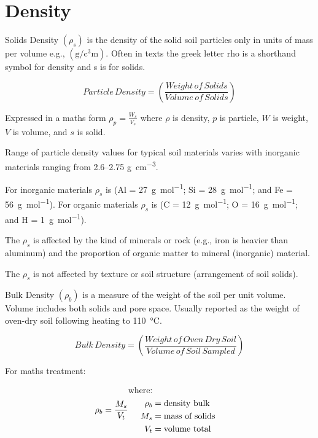 \documentclass[a5paper]{report}
\begin{document}
\section{Density}
\label{density}
    
Solids Density $\left(\rho_s\right)$ is the density of the solid soil particles only in units of mass per volume e.g., $\left(\unit{\gram\per\cubic\centi\metre}\right)$. Often in texts the greek letter rho  is a shorthand symbol for density and s is for solids.

\begin{equation}
    Particle\,Density = \left(\frac{Weight\,of\,Solids}{Volume\,of\,Solids}\right)   
\end{equation}

Expressed in a maths form $\rho_p =\frac{W_s}{V_s}$ where $\rho$ is density, $p$ is particle, $W$ is weight, $V$ is volume, and $s$ is solid.

Range of particle density values for typical soil materials varies with inorganic materials ranging from \numrange{2.6}{2.75} \unit{\gram\per\cubic\centi\metre}.

For inorganic materials $\rho_s$ is  (Al = \qty[per-mode = symbol]{27}{\gram\per\mole}; Si =  \qty[per-mode = symbol]{28}{\gram\per\mole}; and Fe = \qty[per-mode = symbol]{56}{\gram\per\mole}). For organic materials $\rho_s$ is  (C = \qty[per-mode = symbol]{12}{\gram\per\mole}; O = \qty[per-mode = symbol]{16}{\gram\per\mole}; and H = \qty[per-mode = symbol]{1}{\gram\per\mole}).

The $\rho_s$ is affected by the kind of minerals or rock (e.g., iron is heavier than aluminum) and the proportion of organic matter to mineral (inorganic) material.

The $\rho_s$ is not affected by texture or soil structure (arrangement of soil solids).

Bulk Density $\left(\rho_b\right)$ is a measure of the weight of the soil per unit volume. Volume includes both solids and pore space. Usually reported as the weight of oven-dry soil following heating to \qty{110}{\degreeCelsius}.

\begin{equation}
    Bulk\,Density = \left(\frac{Weight\,of\,Oven\,Dry\,Soil}{Volume\,of\,Soil\,Sampled}\right)
\end{equation}

For maths treatment:

\begin{equation}
    \rho_b = \frac{M_s}{V_t}\quad\\
    \begin{aligned}
    \text{where:}\\
        \rho_b &= \text{density bulk} \\
        M_s &= \text{mass of solids} \\
        V_t &= \text{volume total} \\
    \end{aligned}
\end{equation}
\end{document}
